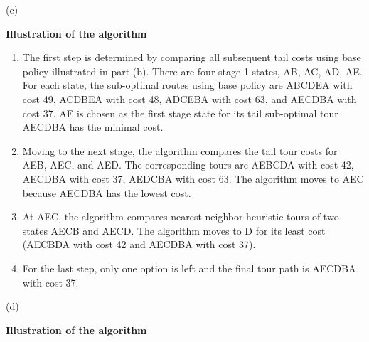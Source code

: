 \documentclass{homework}
\begin{document}
(c)

\textbf{Illustration of the algorithm}

\begin{enumerate}
    \item The first step is determined by comparing all subsequent tail costs using base policy illustrated in part (b). There are four stage 1 states, AB, AC, AD, AE. For each state, the sub-optimal routes using base policy are ABCDEA with cost 49, ACDBEA with cost 48, ADCEBA with cost 63, and AECDBA with cost 37. 
AE is chosen as the first stage state for its tail sub-optimal tour AECDBA has the minimal cost.
\item  Moving to the next stage, the algorithm compares the tail tour costs for AEB, AEC, and AED. The corresponding tours are AEBCDA with cost 42, AECDBA with cost 37, AEDCBA with cost 63. The algorithm moves to AEC because AECDBA has the lowest cost.
\item At AEC, the algorithm compares nearest neighbor heuristic tours of two states AECB and AECD. The algorithm moves to D for its least cost (AECBDA with cost 42 and AECDBA with cost 37).
\item For the last step, only one option is left and the final tour path is AECDBA with cost 37.
\end{enumerate}
 

(d)

\textbf{Illustration of the algorithm}
\end{document}
